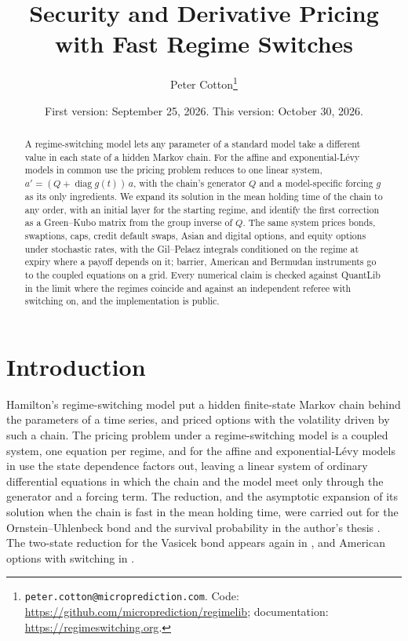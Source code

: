 \documentclass[11pt]{article}
\title{Security and Derivative Pricing with Fast Regime Switches}
\author{Peter Cotton\thanks{\texttt{peter.cotton@microprediction.com}. Code: \url{https://github.com/microprediction/regimelib}; documentation: \url{https://regimeswitching.org}.}}
\date{First version: September 25, 2026. This version: October 30, 2026.}
\theoremstyle{remark}
\newcommand{\diag}{\operatorname{diag}}
\newcommand{\ql}{\textsf{QuantLib}}
\begin{document}
\maketitle

\begin{abstract}
A regime-switching model lets any parameter of a standard model take a different value in each state of a
hidden Markov chain. For the affine and exponential-L\'evy models in common use the pricing problem reduces to
one linear system, $a' = (Q + \diag g(t))\,a$, with the chain's generator $Q$ and a model-specific forcing $g$ as
its only ingredients. We expand its solution in the mean holding time of the chain to any order, with an initial
layer for the starting regime, and identify the first correction as a Green--Kubo matrix from the group inverse
of $Q$. The same system prices bonds, swaptions, caps, credit default swaps, Asian and digital options, and equity
options under stochastic rates, with the Gil--Pelaez integrals conditioned on the regime at expiry where a payoff
depends on it; barrier, American and Bermudan instruments go to the coupled equations on a grid. Every numerical claim is checked against \ql{} in the limit where the regimes coincide and against an
independent referee with switching on, and the implementation is public.
\end{abstract}

\section{Introduction}

Hamilton's regime-switching model \citep{hamilton1989} put a hidden finite-state Markov chain behind the
parameters of a time series, and \citet{naik1993} priced options with the volatility driven by such a chain. The
pricing problem under a regime-switching model is a coupled system, one equation per regime, and for the affine
and exponential-L\'evy models in use the state dependence factors out, leaving a linear system of ordinary
differential equations in which the chain and the model meet only through the generator and a forcing term. The
reduction, and the asymptotic expansion of its solution when the chain is fast in the mean holding time, were
carried out for the Ornstein--Uhlenbeck bond and the survival probability in the author's thesis
\citep{cotton2001}. The two-state reduction for the Vasicek bond appears again in \citet{elliott2002}, and
American options with switching in \citet{buffington2002}.
\end{document}
